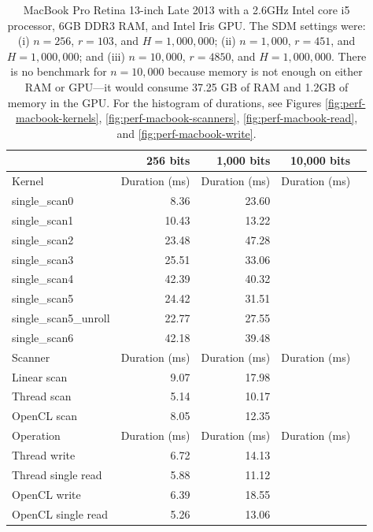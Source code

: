 \begin{table}[!htb]
\centering
\begin{tabular}{lrrrr}
    \toprule
    & \textbf{256 bits} & \textbf{1,000 bits} & \textbf{10,000 bits} \\ \hline
    \hline
	Kernel & Duration (ms) & Duration (ms) & Duration (ms) \\ \hline
    single\_scan0 &  8.36 & 23.60 &  \\
    single\_scan1 & 10.43 & 13.22 &  \\
    single\_scan2 & 23.48 & 47.28 &  \\
    single\_scan3 & 25.51 & 33.06 &  \\
    single\_scan4 & 42.39 & 40.32 &  \\
    single\_scan5 & 24.42 & 31.51 &  \\
	single\_scan5\_unroll & 22.77 & 27.55 & & \\
	single\_scan6 & 42.18 & 39.48 &  \\ \hline
    \hline
	Scanner & Duration (ms) & Duration (ms) & Duration (ms) \\ \hline
    Linear scan & 9.07 & 17.98 & \\
    Thread scan & 5.14 & 10.17 & \\
    OpenCL scan & 8.05 & 12.35 & \\ \hline
    \hline
	Operation & Duration (ms) & Duration (ms) & Duration (ms) \\ \hline
	Thread write       & 6.72 & 14.13 & \\
	Thread single read & 5.88 & 11.12 & \\
	OpenCL write       & 6.39 & 18.55 & \\
	OpenCL single read & 5.26 & 13.06 & \\
    \bottomrule
\end{tabular}
\caption{MacBook Pro Retina 13-inch Late 2013 with a 2.6GHz Intel core i5 processor, 6GB DDR3 RAM, and Intel Iris GPU. The SDM settings were: (i) $n=256$, $r=103$, and $H=1,000,000$; (ii) $n=1,000$, $r=451$, and $H=1,000,000$; and (iii) $n=10,000$, $r=4850$, and $H=1,000,000$. There is no benchmark for $n=10,000$ because memory is not enough on either RAM or GPU---it would consume 37.25 GB of RAM and 1.2GB of memory in the GPU.
For the histogram of durations, see Figures \ref{fig:perf-macbook-kernels}, \ref{fig:perf-macbook-scanners}, \ref{fig:perf-macbook-read}, and \ref{fig:perf-macbook-write}.
\label{tab:perf-macbook}}
\end{table}

